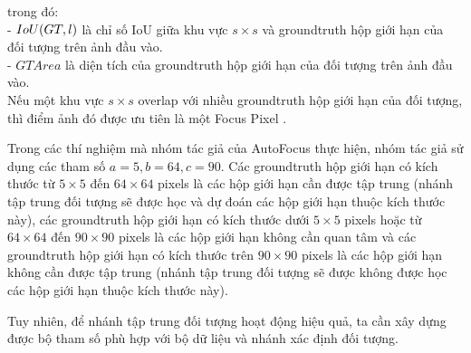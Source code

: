{    \noindent
    trong đó: \\
    - $IoU\index{IoU}(GT, l)$ là chỉ số IoU giữa khu vực $s \times s$ và groundtruth hộp giới hạn của đối tượng trên ảnh đầu vào. \\
    - $GTArea$ là diện tích của groundtruth hộp giới hạn của đối tượng trên ảnh đầu vào. \\
    Nếu một khu vực $s \times s$ overlap với nhiều groundtruth hộp giới hạn của đối tượng, thì điểm ảnh đó được ưu tiên là một Focus Pixel .

    \noindent
    Trong các thí nghiệm mà nhóm tác giả của AutoFocus \cite{najibi2019autofocus} thực hiện, nhóm tác giả sử dụng các tham số $a = 5, b = 64, c = 90$.
    Các groundtruth hộp giới hạn có kích thước từ $5 \times 5$ đến $64 \times 64$ pixels là các hộp giới hạn cần được tập trung (nhánh tập trung đối tượng sẽ được học và dự đoán các hộp giới hạn thuộc kích thước này), các groundtruth hộp giới hạn có kích thước dưới $5 \times 5$ pixels hoặc từ $64 \times 64$ đến $90 \times 90$ pixels là các hộp giới hạn không cần quan tâm và các groundtruth hộp giới hạn có kích thước trên $90 \times 90$ pixels là các hộp giới hạn không cần được tập trung (nhánh tập trung đối tượng sẽ được không được học các hộp giới hạn thuộc kích thước này).
    
    \noindent
    Tuy nhiên, để nhánh tập trung đối tượng hoạt động hiệu quả, ta cần xây dựng được bộ tham số phù hợp với bộ dữ liệu và nhánh xác định đối tượng.

}
